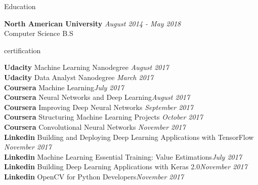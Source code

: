 \documentclass[10pt]{resume} %
\begin{document}
\begin{rSection}{Education}

{\bf North American University} \hfill {\em August 2014 - May 2018} 
\\ Computer Science B.S \hfill {}
 


\end{rSection}



\begin{rSection}{certification} 

{\bf Udacity} Machine Learning Nanodegree \hfill {\em August 2017}
\\ {\bf Udacity} Data Analyst Nanodegree \hfill {\em March 2017}
\\ {\bf Coursera} Machine Learning\hfill {\em July 2017}
\\ {\bf Coursera} Neural Networks and Deep Learning\hfill {\em August 2017}
\\ {\bf Coursera} Improving Deep Neural Networks \hfill {\em September 2017}
\\ {\bf Coursera} Structuring Machine Learning Projects \hfill {\em October 2017}
\\ {\bf Coursera} Convolutional Neural Networks \hfill {\em November 2017}
\\ {\bf Linkedin} Building and Deploying Deep Learning Applications with TensorFlow \hfill {\em November 2017}
\\ {\bf Linkedin} Machine Learning Essential Training: Value Estimations\hfill {\em July 2017}
\\ {\bf Linkedin} Building Deep Learning Applications with Keras 2.0\hfill {\em November 2017}
\\ {\bf Linkedin} OpenCV for Python Developers\hfill {\em November 2017}
\\
\\


\end{rSection}
\end{document}
